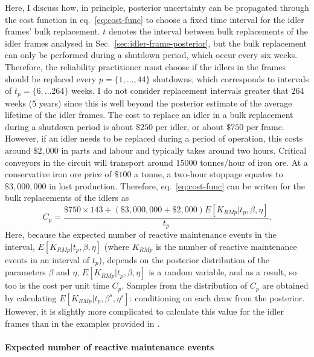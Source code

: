 Here, I discuss how, in principle, posterior uncertainty can be propagated through the cost function in eq.~\eqref{eq:cost-func} to choose a fixed time interval for the idler frames' bulk replacement. $t$ denotes the interval between bulk replacements of the idler frames analysed in Sec.~\ref{sec:idler-frame-posterior}, but the bulk replacement can only be performed during a shutdown period, which occur every six weeks. Therefore, the reliability practitioner must choose if the idlers in the frames should be replaced every $p = \{1,\dots, 44\}$ shutdowns, which corresponds to intervals of $t_p = \{6, \dots 264\}$ weeks. I do not consider replacement intervals greater that $264$ weeks ($5$ years) since this is well beyond the posterior estimate of the average lifetime of the idler frames. The cost to replace an idler in a bulk replacement during a shutdown period is about $\$250$ per idler, or about $\$750$ per frame. However, if an idler needs to be replaced during a period of operation, this costs around $\$2,000$ in parts and labour and typically takes around two hours. Critical conveyors in the circuit will transport around $15000$ tonnes/hour of iron ore. At a conservative iron ore price of $\$100$ a tonne, a two-hour stoppage equates to $\$3{,}000{,}000$ in lost production. Therefore, eq.~\eqref{eq:cost-func} can be writen for the bulk replacements of the idlers as
\begin{equation}
  \label{eq:cost-func-idlers}
 C_p = \frac{\$750 \times 143 + (\$3{,}000{,}000 + \$2{,}000) E[K_{RM p}|t_p,\beta,\eta]}{t_p}.
\end{equation}
Here, because the expected number of reactive maintenance events in the interval, $E[K_{RM p}|t_p,\beta,\eta]$ (where $K_{RM p}$ is the number of reactive maintenance events in an interval of $t_p$), depends on the posterior distribution of the parameters $\beta$ and $\eta$, $E[K_{RM p}|t_p,\beta,\eta]$ is a random variable, and as a result, so too is the cost per unit time $C_p$. Samples from the distribution of $C_p$ are obtained by calculating $E[K_{RM p}|t_p,\beta^s,\eta^s]$: conditioning on each draw from the posterior. However, it is slightly more complicated to calculate this value for the idler frames than in the examples provided in \citet{jardine2013}.

\paragraph*{Expected number of reactive maintenance events}

